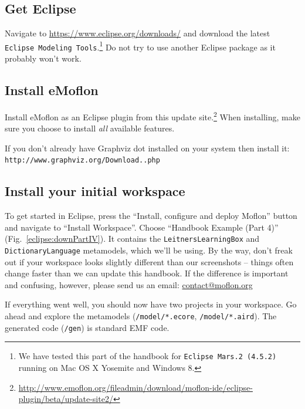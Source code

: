 
\subsection{Get Eclipse}
\label{sec:get-eclipse}

Navigate to \url{https://www.eclipse.org/downloads/} and download the latest \texttt{Eclipse Modeling Tools}.\footnote{We have tested this part of the handbook for \texttt{Eclipse Mars.2 (4.5.2)} running on Mac OS X Yosemite and Windows 8.}
Do not try to use another Eclipse package as it probably won't work.

\subsection{Install eMoflon}
\label{sec:get-emoflon}

Install eMoflon as an Eclipse plugin from this update site.\footnote{\url{http://www.emoflon.org/fileadmin/download/moflon-ide/eclipse-plugin/beta/update-site2/}}
When installing, make sure you choose to install \emph{all} available features.

If you don't already have Graphviz dot installed on your system then install it:  \texttt{http://www.graphviz.org/Download..php}

\subsection{Install your initial workspace}
\label{sec:loadSourceMeta}

To get started in Eclipse, press the ``Install, configure and deploy Moflon'' button and navigate to ``Install Workspace''. 
Choose ``Handbook Example (Part 4)'' (Fig.~\ref{eclipse:downPartIV}). 
It contains the \texttt{Leitners\-Learning\-Box} and \texttt{Dictionary\-Language} metamodels, which we'll be using. 
By the way, don't freak out if your workspace looks slightly different than our screenshots -- things often change faster than we can update this handbook.
If the difference is important and confusing, however, please send us an email:  \url{contact@moflon.org}

If everything went well, you should now have two projects in your workspace.  
Go ahead and explore the metamodels (\texttt{/model/*.ecore}, \texttt{/model/*.aird}).
The generated code (\texttt{/gen}) is standard EMF code.

